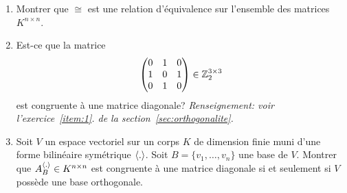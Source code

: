 \begin{enumerate}
\item Montrer que $\cong$ est une relation d'équivalence sur l'ensemble des matrices $K^{n\times n}$. 
\item Est-ce que la matrice 
  \begin{displaymath}
    \begin{pmatrix}
      0 & 1 & 0 \\
      1 & 0 & 1\\
      0 & 1 & 0 
    \end{pmatrix} \in \mathbb{Z}_2^{3\times 3} 
  \end{displaymath}
  est congruente à une matrice diagonale? \emph{Renseignement: voir l'exercice~\ref{item:1}. de la section~\ref{sec:orthogonalite}.}  
\item Soit $V$ un espace vectoriel  sur un corps $K$ de dimension finie muni d'une forme bilinéaire symétrique $\langle {.} \rangle$. Soit $B = \{v_1,\dots,v_n\}$ une base de $V$. Montrer que $A_B^{\langle {.} \rangle} \in K^{n \times n}$ est congruente à une matrice diagonale si  et seulement si $V$ possède une base orthogonale. 


\end{enumerate}

